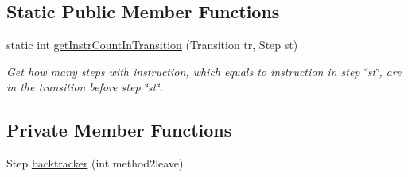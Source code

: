 \subsection*{Static Public Member Functions}
\begin{DoxyCompactItemize}
\item 
static int \hyperlink{classgov_1_1nasa_1_1jpf_1_1inspector_1_1server_1_1pathanalysis_1_1_method_instruction_backtracker_aff0fbf3f95be96b8dfd5d3e8ecb7ebdc}{get\+Instr\+Count\+In\+Transition} (Transition tr, Step st)
\begin{DoxyCompactList}\small\item\em Get how many steps with instruction, which equals to instruction in step \char`\"{}st\char`\"{}, are in the transition before step \char`\"{}st\char`\"{}. \end{DoxyCompactList}\end{DoxyCompactItemize}
\subsection*{Private Member Functions}
\begin{DoxyCompactItemize}
\item 
Step \hyperlink{classgov_1_1nasa_1_1jpf_1_1inspector_1_1server_1_1pathanalysis_1_1_method_instruction_backtracker_abf50e09a94ed43dee679517bacc2ef14}{backtracker} (int method2leave)
\end{DoxyCompactItemize}

